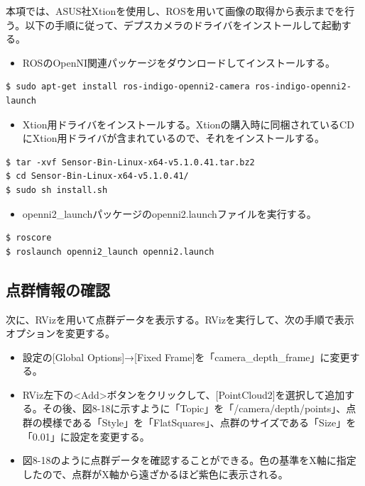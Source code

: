 本項では、ASUS社Xtionを使用し、ROSを用いて画像の取得から表示までを行う。以下の手順に従って、デプスカメラのドライバをインストールして起動する。

\begin{itemize}
\item ROSのOpenNI関連パッケージをダウンロードしてインストールする。
\end{itemize}

\begin{lstlisting}[language=ROS]
$ sudo apt-get install ros-indigo-openni2-camera ros-indigo-openni2-launch
\end{lstlisting}

\begin{itemize}
\item Xtion用ドライバをインストールする。Xtionの購入時に同梱されているCDにXtion用ドライバが含まれているので、それをインストールする。
\end{itemize}

\begin{lstlisting}[language=ROS]
$ tar -xvf Sensor-Bin-Linux-x64-v5.1.0.41.tar.bz2
$ cd Sensor-Bin-Linux-x64-v5.1.0.41/
$ sudo sh install.sh
\end{lstlisting}

\begin{itemize}
\item openni2\_launchパッケージのopenni2.launchファイルを実行する。
\end{itemize}

\begin{lstlisting}[language=ROS]
$ roscore
$ roslaunch openni2_launch openni2.launch
\end{lstlisting}

\subsection{点群情報の確認}

次に、RVizを用いて点群データを表示する。RVizを実行して、次の手順で表示オプションを変更する。

\begin{itemize}
\item 設定の[Global Options]→[Fixed Frame]を「camera\_depth\_frame」に変更する。
\item RViz左下の<Add>ボタンをクリックして、[PointCloud2]を選択して追加する。その後、図8-18に示すように「Topic」を「/camera/depth/points」、点群の模様である「Style」を「FlatSquares」、点群のサイズである「Size」を「0.01」に設定を変更する。
\item 図8-18のように点群データを確認することができる。色の基準をX軸に指定したので、点群がX軸から遠ざかるほど紫色に表示される。
\end{itemize}

